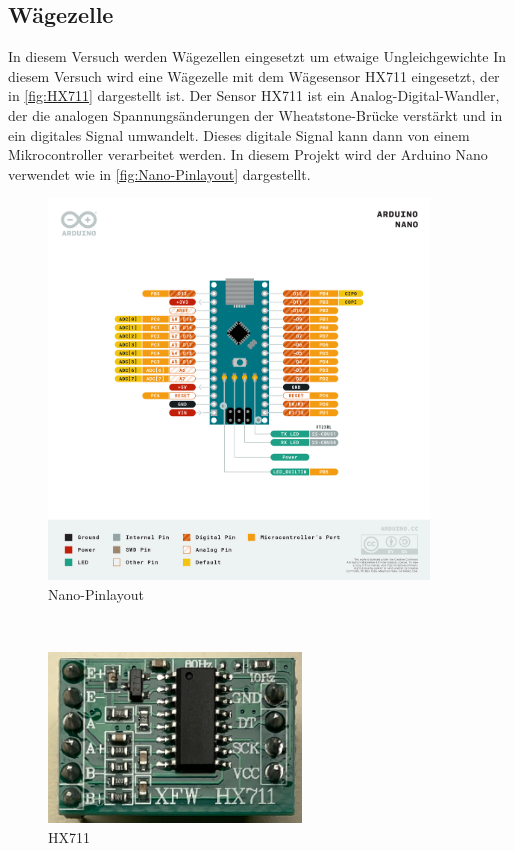 \subsection{Wägezelle}

In diesem Versuch werden Wägezellen eingesetzt um etwaige Ungleichgewichte
In diesem Versuch wird eine Wägezelle mit dem Wägesensor HX711 eingesetzt, der in \autoref{fig:HX711} dargestellt ist.
Der Sensor HX711 ist ein Analog-Digital-Wandler, der die analogen Spannungsänderungen der Wheatstone-Brücke verstärkt und in ein digitales Signal umwandelt.
Dieses digitale Signal kann dann von einem Mikrocontroller verarbeitet werden.
In diesem Projekt wird der Arduino Nano verwendet wie in \autoref{fig:Nano-Pinlayout} dargestellt.
\begin{figure}[h!]
    \centering
    \includegraphics[width=0.9\textwidth]{img/Nano-Pinlayout.png}
    \caption{Nano-Pinlayout \cite{Arduino}}
    \label{fig:Nano-Pinlayout}
\end{figure}
~\\
\begin{figure}[h!]
    \centering
    \includegraphics[width=0.6\textwidth]{img/HX711.png}
    \caption{HX711 \cite{prilchen}}
    \label{fig:HX711}
\end{figure}
